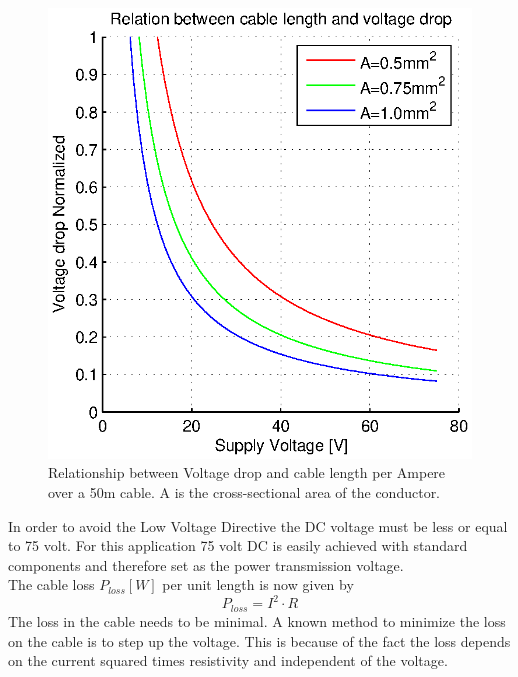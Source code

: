 \begin{figure}[H]
\centering
\includegraphics[scale=0.75]{graphics/matlab/cable_relation_voltage_drop.eps}
\caption{Relationship between Voltage drop and cable length per Ampere over a 50m cable. A is the cross-sectional area of the conductor.}
\label{fig:relation_voltage_drop}
\end{figure}

\noindent
In order to avoid the Low Voltage Directive \cite{Parliament2006} the DC voltage must be less or equal to 75 volt. For this application 75 volt DC is easily achieved with standard components and therefore set as the power transmission voltage. \\

\noindent
The cable loss $P_{loss}[W]$ per unit length is now given by
\begin{equation}
P_{loss} = I^2 \cdot R
\end{equation}
\noindent
The loss in the cable needs to be minimal. A known method to minimize the loss on the cable is to step up the voltage. This is because of the fact the loss depends on the current squared times resistivity and independent of the voltage. 


